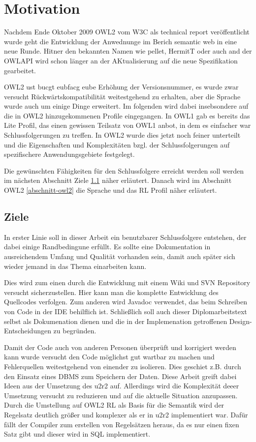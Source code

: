 \chapter{Motivation}
\label{kapitel-motivation}

Nachdem Ende Oktober 2009 OWL2 vom W3C als technical report veröffentlicht wurde geht die Entwicklung der Anwednunge im Berich semantic web in eine neue Runde. Hitner den bekannten Namen wie pellet, HermitT oder auch and der OWLAPI wird schon länger an der AKtualisierung auf die neue Spezifikation gearbeitet.

OWL2 ust bucgt eubfacg eube Erhöhung der Versionsnummer, es wurde zwar versucht Rückwärtskompatibilität weitestgehend zu erhalten, aber die Sprache wurde auch um einige Dinge erweitert. Im folgenden wird dabei  insebsondere auf die in OWL2 hinzugekommenen Profile eingegangen. In OWL1 gab es bereits das Lite Profil, das einen gewissen Teilsatz von OWL1 anbot, in dem es einfacher war Schlussfolgerungen zu treffen. In OWL2 wurde dies jetzt noch feiner unterteilt und die Eigenschaften und Komplexitäten bzgl. der Schlussfolgerungen auf spezifischere Anwendungsgebiete festgelegt.

Die gewünschten Fähigkeiten für den Schlussfolgere erreicht werden soll werden im nächsten Abschnitt Ziele \ref{abschnitt-ziele} näher erläutert. Danach wird im Abschnitt OWL2 \ref{abschnitt-owl2} die Sprache und das RL Profil näher erläutert.

\section{Ziele}
\label{abschnitt-ziele}

In erster Linie soll in dieser Arbeit ein benutzbarer Schlussfolgere entstehen, der dabei einige Randbedingune erfüllt. Es sollte eine Dokumentation in ausreichendem Umfang und Qualität vorhanden sein, damit auch später sich wieder jemand in das Thema einarbeiten kann.

Dies wird zum einen durch die Entwicklung mit einem Wiki und SVN Repository versucht sicherzustellen. Hier kann man die komplette Entwicklung des Quellcodes verfolgen. Zum anderen wird Javadoc verwendet, das beim Schreiben von Code in der IDE behilflich ist. Schließlich soll auch dieser Diplomarbeitstext selbst als Dokumenation dienen und die in der Implemenation getroffenen Design-Entscheidungen zu begründen.

Damit der Code auch von anderen Personen überprüft und korrigiert werden kann wurde versucht den Code möglichst gut wartbar zu machen und Fehlerquellen weitestgehend von einender zu isolieren. Dies geschiet z.B. durch den Einsatz eines DBMS zum Speichern der Daten. Diese Arbeit greift dabei Ideen aus der Umsetzung des u2r2 \cite{Weithoehner2008} auf.
Allerdings wird die Komplexität deeer Umsetzung versucht zu reduzieren und auf die aktuelle Situation anzupassen. Durch die Umstellung auf OWL2 RL als Basis für die Semantik wird der Regelsatz deutlich größer und komplexer als er in u2r2 implementiert war. Dafür fällt der Compiler zum erstellen von Regelsätzen heraus, da es nur einen fixen Satz gibt und dieser wird in SQL implementiert.


